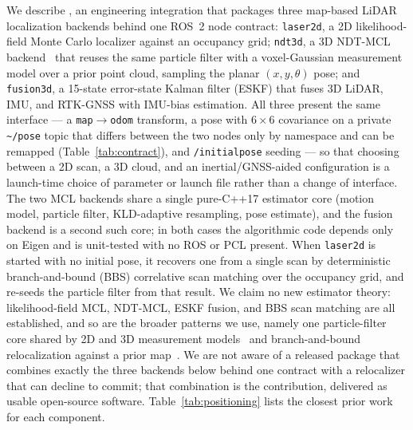 We describe \prismloc{}, an engineering integration that packages three
map-based LiDAR localization backends behind one ROS~2 node contract:
\texttt{laser2d}, a 2D likelihood-field Monte Carlo localizer against an
occupancy grid; \texttt{ndt3d}, a 3D NDT-MCL
backend~\cite{saarinen2013ndtmcl} that reuses the same particle filter
with a voxel-Gaussian measurement model over a prior point cloud,
sampling the planar $(x, y, \theta)$ pose; and \texttt{fusion3d}, a
15-state error-state Kalman filter (ESKF) that fuses 3D LiDAR, IMU, and
RTK-GNSS with IMU-bias estimation. All three present the same
interface --- a \texttt{map}$\to$\texttt{odom} transform, a pose with
$6\times6$ covariance on a private \texttt{\textasciitilde/pose} topic
that differs between the two nodes only by namespace and can be
remapped (Table~\ref{tab:contract}), and \texttt{/initialpose}
seeding --- so that choosing between a 2D scan, a 3D cloud, and an
inertial/GNSS-aided configuration is a launch-time choice of parameter
or launch file rather than a change of interface. The two MCL backends
share a single pure-C++17 estimator core (motion model, particle
filter, KLD-adaptive resampling, pose estimate), and the fusion backend
is a second such core; in both cases the algorithmic code depends only
on Eigen and is unit-tested with no ROS or PCL present. When
\texttt{laser2d} is started with no initial pose, it recovers one from a
single scan by deterministic branch-and-bound (BBS) correlative scan
matching over the occupancy grid, and re-seeds the particle filter from
that result. We claim no new estimator theory: likelihood-field MCL,
NDT-MCL, ESKF fusion, and BBS scan matching are all established, and so
are the broader patterns we use, namely one particle-filter core shared
by 2D and 3D measurement models~\cite{puga2024beluga,ekumen2022belugarepo}
and branch-and-bound relocalization against a prior
map~\cite{hess2016realtime,koide2021hdlgl}. We are not aware of a
released package that combines exactly the three backends below behind
one contract with a relocalizer that can decline to commit; that
combination is the contribution, delivered as usable open-source
software. Table~\ref{tab:positioning} lists the closest prior work for
each component.

